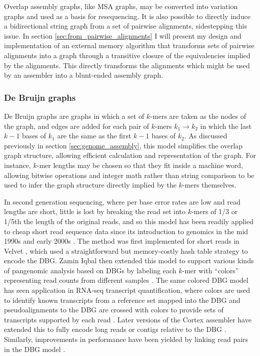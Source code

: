 
Overlap assembly graphs, like MSA graphs, may be converted into variation graphs and used as a basis for resequencing.
It is also possible to directly induce a bidirectional string graph from a set of pairwise alignments, sidestepping this issue.
In section \ref{sec:from_pairwise_alignments} I will present my design and implementation of an external memory algorithm that transforms sets of pairwise alignments into a graph through a transitive closure of the equivalencies implied by the alignments.
This directly transforms the alignments which might be used by an assembler into a blunt-ended assembly graph.

\subsubsection{De Bruijn graphs}
\label{sec:de_bruijn_graphs}

De Bruijn graphs \cite{de1946combinatorial} are graphs in which a set of $k$-mers are taken as the nodes of the graph, and edges are added for each pair of $k$-mers $k_1 \rightarrow k_2$ in which the last $k-1$ bases of $k_1$ are the same as the first $k-1$ bases of $k_2$.
As discussed previously in section \ref{sec:genome_assembly}, this model simplifies the overlap graph structure, allowing efficient calculation and representation of the graph.
For instance, $k$-mer lengths may be chosen so that they fit inside a machine word, allowing bitwise operations and integer math rather than string comparison to be used to infer the graph structure directly implied by the $k$-mers themselves.

In second generation sequencing, where per base error rates are low and read lengths are short, little is lost by breaking the read set into $k$-mers of 1/3 or 1/5th the length of the original reads, and so this model has been readily applied to cheap short read sequence data since its introduction to genomics in the mid 1990s and early 2000s \cite{idury1995new,pevzner2001eulerian}.
The method was first implemented for short reads in Velvet \cite{zerbino2008velvet}, which used a straightforward but memory-costly hash table strategy to encode the DBG.
Zamin Iqbal then extended this model to support various kinds of pangenomic analysis based on DBGs by labeling each $k$-mer with ``colors'' representing read counts from different samples \cite{iqbal2012novo}.
The same colored DBG model has seen application in RNA-seq transcript quantification, where colors are used to identify known transcripts from a reference set mapped into the DBG and pseudoalignments to the DBG are crossed with colors to provide sets of transcripts supported by each read \cite{bray2016near}.
Later versions of the Cortex assembler have extended this to fully encode long reads or contigs relative to the DBG \cite{turner2018integrating}.
Similarly, improvements in performance have been yielded by linking read pairs in the DBG model \cite{bankevich2012spades}.

